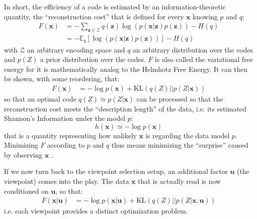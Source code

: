 \documentclass[12pt,twoside,openright]{article}
\begin{document}
In short, the efficiency of a code is estimated by an information-theoretic quantity, the ``reconstruction cost'' that is defined for every $\boldsymbol{x}$ knowing $p$ and $q$:
\begin{align}
F(\boldsymbol{x}) &= - \sum_{\boldsymbol{z} \in \mathcal{Z}} q(\boldsymbol{z}) \log (p(\boldsymbol{x}|\boldsymbol{z})p(\boldsymbol{z})) - H(q)\nonumber\\
&= - \mathbb{E}_q \left[\log (p(\boldsymbol{x}|\boldsymbol{z})p(\boldsymbol{z}))\right] - H(q)
\end{align}
with $\mathcal{Z}$ an arbitrary encoding space and $q$ an arbitrary distribution over the codes and $p(Z)$ a prior distribution over the codes.
$F$ is also called the variational free energy for it is mathematically analog to the Helmhotz Free Energy.
It can then be shown, with some reordering, that:
\begin{align}
F(\boldsymbol{x}) 
&= - \log p(\boldsymbol{x}) + \text{KL}(q(Z)||p(Z|\boldsymbol{x}))
\label{eq:FEP}
\end{align}
so that an optimal code $q(Z)\simeq p(Z|\boldsymbol{x})$ can be processed so that the reconstruction cost meets the ``description length'' of the data, i.e. its estimated Shannon's Information under the model $p$:
$$h(\boldsymbol{x}) \simeq -\log p(\boldsymbol{x}) %
$$
that is a quantity representing how unlikely $\boldsymbol{x}$ is regarding the data model $p$. Minimizing $F$ according to $p$ and $q$ thus means minimizing the ``surprise'' caused by observing $\boldsymbol{x}$ \cite{friston2010free}.



If we now turn back to the viewpoint selection setup, an additional factor $\boldsymbol{u}$ (the viewpoint) comes into the play. The data $\boldsymbol{x}$ that is actually read is now conditioned on  $\boldsymbol{u}$, so that:
\begin{align}
F(\boldsymbol{x}|\boldsymbol{u}) 
&= - \log p(\boldsymbol{x}|\boldsymbol{u}) + \text{KL}(q(Z)||p(Z|\boldsymbol{x}, \boldsymbol{u}))
\label{eq:FEP-u}\end{align}
i.e. each viewpoint provides a distinct optimization problem. 
\end{document}
